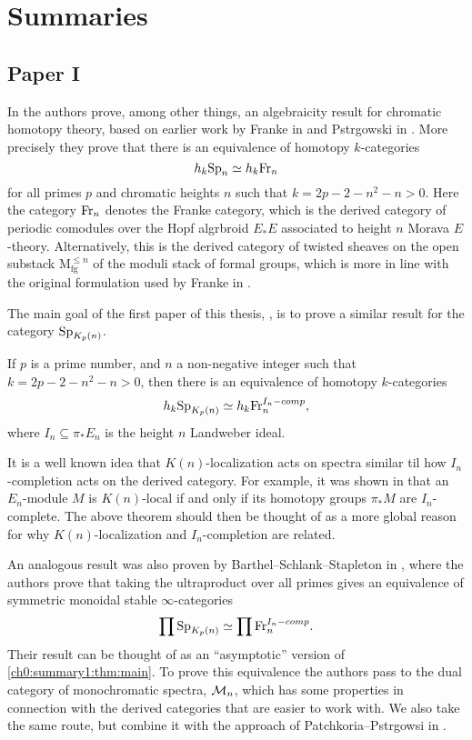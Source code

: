 \section{Summaries}

\subsection{Paper I}

In \cite{patchkoria-pstragowski_2021} the authors prove, among other things, an algebraicity result for chromatic homotopy theory, based on earlier work by Franke in \cite{franke_96} and Pstr\a{}gowski in \cite{pstragowski_2021}. More precisely they prove that there is an equivalence of homotopy $k$-categories 
\[h_k \mathrm{Sp}_{n} \simeq h_k \mathrm{Fr}_{n}\]
for all primes $p$ and chromatic heights $n$ such that $k = 2p-2-n^2-n > 0$. Here the category $\mathrm{Fr}_{n}$ denotes the Franke category, which is the derived category of periodic comodules over the Hopf algrbroid $E_*E$ associated to height $n$ Morava $E$-theory. Alternatively, this is the derived category of twisted sheaves on the open substack $\mathrm{M}_{\mathrm{fg}}^{\leq n}$ of the moduli stack of formal groups, which is more in line with the original formulation used by Franke in \cite{franke_96}. 

The main goal of the first paper of this thesis, \cite{aambo_2024_algebraicity}, is to prove a similar result for the category $\mathrm{Sp}_{K_p(n)}$. 

\begin{theorem}
    \label{ch0:summary1:thm:main}
    If $p$ is a prime number, and $n$ a non-negative integer such that $k = 2p-2-n^2-n > 0$, then there is an equivalence of homotopy $k$-categories 
    \[h_k \mathrm{Sp}_{K_p(n)} \simeq h_k\mathrm{Fr}_{n}^{I_n-comp},\]
    where $I_n \subseteq \pi_* E_n$ is the height $n$ Landweber ideal. 
\end{theorem}

It is a well known idea that $K(n)$-localization acts on spectra similar til how $I_n$-completion acts on the derived category. For example, it was shown in \citeme that an $E_n$-module $M$ is $K(n)$-local if and only if its homotopy groups $\pi_* M$ are $I_n$-complete. The above theorem should then be thought of as a more global reason for why $K(n)$-localization and $I_n$-completion are related. 

An analogous result was also proven by Barthel--Schlank--Stapleton in \cite{barthel-schlank-stapleton_2021}, where the authors prove that taking the ultraproduct over all primes gives an equivalence of symmetric monoidal stable $\infty$-categories 
\[\prod \mathrm{Sp}_{K_p(n)} \simeq \prod \mathrm{Fr}_{n}^{I_n-comp}.\]
Their result can be thought of as an ``asymptotic'' version of \cref{ch0:summary1:thm:main}. To prove this equivalence the authors pass to the dual category of monochromatic spectra, $\mathcal{M}_{n}$, which has some properties in connection with the derived categories that are easier to work with. We also take the same route, but combine it with the approach of Patchkoria--Pstr\a{}gowsi in \cite{patchkoria-pstragowski_2021}. 

